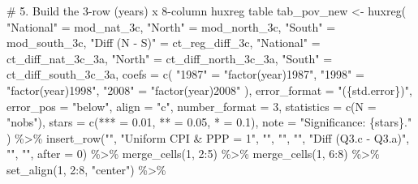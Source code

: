 \documentclass[
  letterpaper,
  DIV=11,
  numbers=noendperiod]{scrartcl}
\newenvironment{Shaded}{\begin{snugshade}}{\end{snugshade}}
\newcommand{\AttributeTok}[1]{\textcolor[rgb]{0.40,0.45,0.13}{#1}}
\newcommand{\CommentTok}[1]{\textcolor[rgb]{0.37,0.37,0.37}{#1}}
\newcommand{\DecValTok}[1]{\textcolor[rgb]{0.68,0.00,0.00}{#1}}
\newcommand{\FloatTok}[1]{\textcolor[rgb]{0.68,0.00,0.00}{#1}}
\newcommand{\FunctionTok}[1]{\textcolor[rgb]{0.28,0.35,0.67}{#1}}
\newcommand{\NormalTok}[1]{\textcolor[rgb]{0.00,0.23,0.31}{#1}}
\newcommand{\OtherTok}[1]{\textcolor[rgb]{0.00,0.23,0.31}{#1}}
\newcommand{\SpecialCharTok}[1]{\textcolor[rgb]{0.37,0.37,0.37}{#1}}
\newcommand{\StringTok}[1]{\textcolor[rgb]{0.13,0.47,0.30}{#1}}
\begin{document}
\begin{Shaded}
\begin{Highlighting}[]
\CommentTok{\# 5. Build the 3{-}row (years) x 8{-}column huxreg table}
\NormalTok{tab\_pov\_new }\OtherTok{\textless{}{-}} \FunctionTok{huxreg}\NormalTok{(}
  \StringTok{"National"} \OtherTok{=}\NormalTok{ mod\_nat\_3c,}
  \StringTok{"North"} \OtherTok{=}\NormalTok{ mod\_north\_3c,}
  \StringTok{"South"} \OtherTok{=}\NormalTok{ mod\_south\_3c,}
  \StringTok{"Diff (N {-} S)"} \OtherTok{=}\NormalTok{ ct\_reg\_diff\_3c,}
  \StringTok{"National"} \OtherTok{=}\NormalTok{ ct\_diff\_nat\_3c\_3a,}
  \StringTok{"North"} \OtherTok{=}\NormalTok{ ct\_diff\_north\_3c\_3a,}
  \StringTok{"South"} \OtherTok{=}\NormalTok{ ct\_diff\_south\_3c\_3a,}
  \AttributeTok{coefs =} \FunctionTok{c}\NormalTok{(}
    \StringTok{"1987"} \OtherTok{=} \StringTok{"factor(year)1987"}\NormalTok{,}
    \StringTok{"1998"} \OtherTok{=} \StringTok{"factor(year)1998"}\NormalTok{,}
    \StringTok{"2008"} \OtherTok{=} \StringTok{"factor(year)2008"}
\NormalTok{  ),}
  \AttributeTok{error\_format =} \StringTok{"(\{std.error\})"}\NormalTok{,}
  \AttributeTok{error\_pos =} \StringTok{"below"}\NormalTok{,}
  \AttributeTok{align =} \StringTok{"c"}\NormalTok{,}
  \AttributeTok{number\_format =} \DecValTok{3}\NormalTok{,}
  \AttributeTok{statistics =} \FunctionTok{c}\NormalTok{(}\AttributeTok{N =} \StringTok{"nobs"}\NormalTok{),}
  \AttributeTok{stars =} \FunctionTok{c}\NormalTok{(}\StringTok{\textasciigrave{}}\AttributeTok{***}\StringTok{\textasciigrave{}} \OtherTok{=} \FloatTok{0.01}\NormalTok{, }\StringTok{\textasciigrave{}}\AttributeTok{**}\StringTok{\textasciigrave{}} \OtherTok{=} \FloatTok{0.05}\NormalTok{, }\StringTok{\textasciigrave{}}\AttributeTok{*}\StringTok{\textasciigrave{}} \OtherTok{=} \FloatTok{0.1}\NormalTok{),}
  \AttributeTok{note =} \StringTok{"Significance: \{stars\}."}
\NormalTok{) }\SpecialCharTok{\%\textgreater{}\%}
  \FunctionTok{insert\_row}\NormalTok{(}\StringTok{""}\NormalTok{, }\StringTok{"Uniform CPI \& PPP = 1"}\NormalTok{, }\StringTok{""}\NormalTok{, }\StringTok{""}\NormalTok{, }\StringTok{""}\NormalTok{, }\StringTok{"Diff (Q3.c {-} Q3.a)"}\NormalTok{, }\StringTok{""}\NormalTok{, }\StringTok{""}\NormalTok{, }\AttributeTok{after =} \DecValTok{0}\NormalTok{) }\SpecialCharTok{\%\textgreater{}\%}
  \FunctionTok{merge\_cells}\NormalTok{(}\DecValTok{1}\NormalTok{, }\DecValTok{2}\SpecialCharTok{:}\DecValTok{5}\NormalTok{) }\SpecialCharTok{\%\textgreater{}\%}
  \FunctionTok{merge\_cells}\NormalTok{(}\DecValTok{1}\NormalTok{, }\DecValTok{6}\SpecialCharTok{:}\DecValTok{8}\NormalTok{) }\SpecialCharTok{\%\textgreater{}\%}
  \FunctionTok{set\_align}\NormalTok{(}\DecValTok{1}\NormalTok{, }\DecValTok{2}\SpecialCharTok{:}\DecValTok{8}\NormalTok{, }\StringTok{"center"}\NormalTok{) }\SpecialCharTok{\%\textgreater{}\%}

\end{Highlighting}
\end{Shaded}
\end{document}

